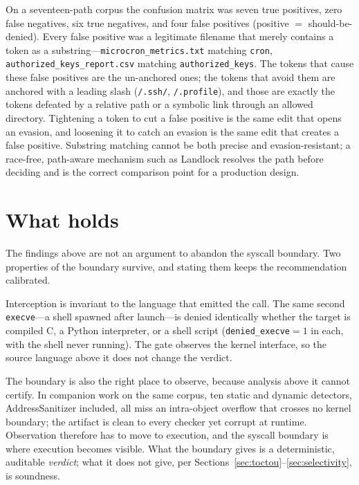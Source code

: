 \documentclass[11pt]{article}
\begin{document}
On a seventeen-path corpus the confusion matrix was seven true positives, zero false negatives, six
true negatives, and four false positives (positive $=$ should-be-denied). Every false positive was a
legitimate filename that merely contains a token as a substring---\texttt{microcron\_metrics.txt}
matching \texttt{cron}, \texttt{authorized\_keys\_report.csv} matching \texttt{authorized\_keys}. The
tokens that cause these false positives are the un-anchored ones; the tokens that avoid them are anchored
with a leading slash (\texttt{/.ssh/}, \texttt{/.profile}), and those are exactly the tokens defeated by a
relative path or a symbolic link through an allowed directory. Tightening a token to cut a false positive
is the same edit that opens an evasion, and loosening it to catch an evasion is the same edit that creates
a false positive. Substring matching cannot be both precise and evasion-resistant; a race-free, path-aware
mechanism such as Landlock resolves the path before deciding and is the correct comparison point for a
production design.

\section{What holds}\label{sec:holds}

The findings above are not an argument to abandon the syscall boundary. Two properties of the boundary
survive, and stating them keeps the recommendation calibrated.

Interception is invariant to the language that emitted the call. The same second \texttt{execve}---a
shell spawned after launch---is denied identically whether the target is compiled C, a Python
interpreter, or a shell script (\texttt{denied\_execve}$=1$ in each, with the shell never running). The
gate observes the kernel interface, so the source language above it does not change the verdict.

The boundary is also the right place to observe, because analysis above it cannot certify. In companion
work on the same corpus, ten static and dynamic detectors, AddressSanitizer included, all miss an
intra-object overflow that crosses no kernel boundary; the artifact is clean to every checker yet
corrupt at runtime. Observation therefore has to move to execution, and the syscall boundary is where
execution becomes visible. What the boundary gives is a deterministic, auditable \emph{verdict}; what it
does not give, per Sections~\ref{sec:toctou}--\ref{sec:selectivity}, is soundness.
\end{document}
